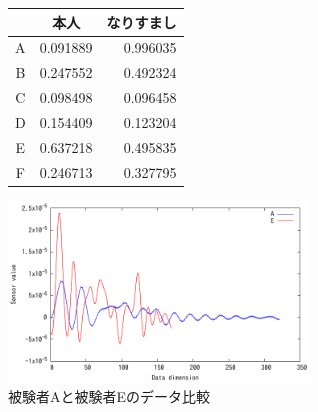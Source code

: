 \begin{figure}[!tb]
  \def\@captype{table}
  \begin{minipage}{.48\textwidth}
    \centering
    \label{auth-result}
    \begin{tabular}{|c|r|r|} \hline
      \multicolumn{1}{|c|}{}  & \multicolumn{1}{c|}{本人} & \multicolumn{1}{c|}{なりすまし} \\ \hline \hline
      A & 0.091889 & 0.996035 \\ \hline
      B & 0.247552 & 0.492324 \\ \hline
      C & 0.098498 & 0.096458 \\ \hline
      D & 0.154409 & 0.123204 \\ \hline
      E & 0.637218 & 0.495835 \\ \hline
      F & 0.246713 & 0.327795 \\ \hline
    \end{tabular}
  \end{minipage}
  \hfill
  \begin{minipage}{.48\textwidth}
    \centering
    \includegraphics[bb=0 0 360 216, width=8cm]{Graphs/comp.pdf}
    \caption{被験者Aと被験者Eのデータ比較}
    \label{compare}
  \end{minipage}
\end{figure}
